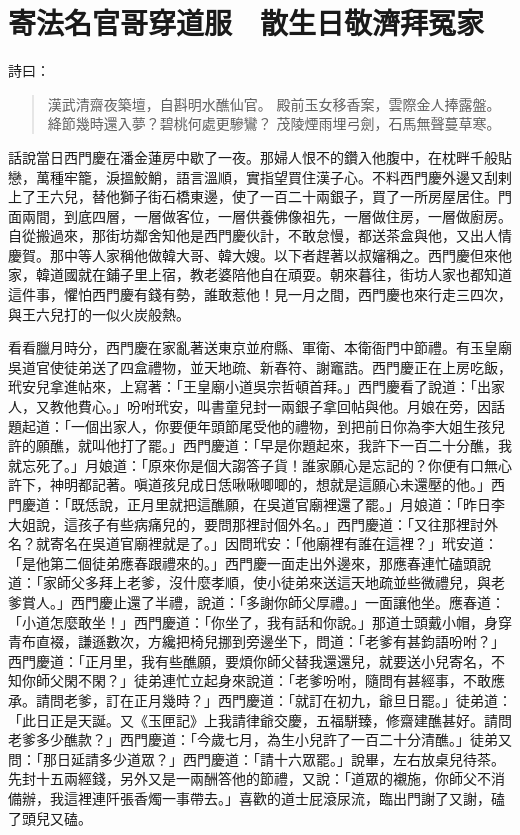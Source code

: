 
\chapter{寄法名官哥穿道服　散生日敬濟拜冤家}

詩曰：
\begin{quote}
漢武清齋夜築壇，自斟明水醮仙官。
殿前玉女移香案，雲際金人捧露盤。
絳節幾時還入夢？碧桃何處更驂鸞？
茂陵煙雨埋弓劍，石馬無聲蔓草寒。
\end{quote}

話說當日西門慶在潘金蓮房中歇了一夜。那婦人恨不的鑽入他腹中，在枕畔千般貼戀，萬種牢籠，淚搵鮫鮹，語言溫順，實指望買住漢子心。不料西門慶外邊又刮剌上了王六兒，替他獅子街石橋東邊，使了一百二十兩銀子，買了一所房屋居住。門面兩間，到底四層，一層做客位，一層供養佛像祖先，一層做住房，一層做廚房。自從搬過來，那街坊鄰舍知他是西門慶伙計，不敢怠慢，都送茶盒與他，又出人情慶賀。那中等人家稱他做韓大哥、韓大嫂。以下者趕著以叔嬸稱之。西門慶但來他家，韓道國就在鋪子里上宿，教老婆陪他自在頑耍。朝來暮往，街坊人家也都知道這件事，懼怕西門慶有錢有勢，誰敢惹他！見一月之間，西門慶也來行走三四次，與王六兒打的一似火炭般熱。

看看臘月時分，西門慶在家亂著送東京並府縣、軍衛、本衛衙門中節禮。有玉皇廟吳道官使徒弟送了四盒禮物，並天地疏、新春符、謝竈誥。西門慶正在上房吃飯，玳安兒拿進帖來，上寫著：「王皇廟小道吳宗哲頓首拜。」西門慶看了說道：「出家人，又教他費心。」吩咐玳安，叫書童兒封一兩銀子拿回帖與他。月娘在旁，因話題起道：「一個出家人，你要便年頭節尾受他的禮物，到把前日你為李大姐生孩兒許的願醮，就叫他打了罷。」西門慶道：「早是你題起來，我許下一百二十分醮，我就忘死了。」月娘道：「原來你是個大謅答子貨！誰家願心是忘記的？你便有口無心許下，神明都記著。嗔道孩兒成日恁啾啾唧唧的，想就是這願心未還壓的他。」西門慶道：「既恁說，正月里就把這醮願，在吳道官廟裡還了罷。」月娘道：「昨日李大姐說，這孩子有些病痛兒的，要問那裡討個外名。」西門慶道：「又往那裡討外名？就寄名在吳道官廟裡就是了。」因問玳安：「他廟裡有誰在這裡？」玳安道：「是他第二個徒弟應春跟禮來的。」西門慶一面走出外邊來，那應春連忙磕頭說道：「家師父多拜上老爹，沒什麼孝順，使小徒弟來送這天地疏並些微禮兒，與老爹賞人。」西門慶止還了半禮，說道：「多謝你師父厚禮。」一面讓他坐。應春道：「小道怎麼敢坐！」西門慶道：「你坐了，我有話和你說。」那道士頭戴小帽，身穿青布直裰，謙遜數次，方纔把椅兒挪到旁邊坐下，問道：「老爹有甚鈞語吩咐？」西門慶道：「正月里，我有些醮願，要煩你師父替我還還兒，就要送小兒寄名，不知你師父閑不閑？」徒弟連忙立起身來說道：「老爹吩咐，隨問有甚經事，不敢應承。請問老爹，訂在正月幾時？」西門慶道：「就訂在初九，爺旦日罷。」徒弟道：「此日正是天誕。又《玉匣記》上我請律爺交慶，五福駢臻，修齋建醮甚好。請問老爹多少醮款？」西門慶道：「今歲七月，為生小兒許了一百二十分清醮。」徒弟又問：「那日延請多少道眾？」西門慶道：「請十六眾罷。」說畢，左右放桌兒待茶。先封十五兩經錢，另外又是一兩酬答他的節禮，又說：「道眾的襯施，你師父不消備辦，我這裡連阡張香燭一事帶去。」喜歡的道士屁滾尿流，臨出門謝了又謝，磕了頭兒又磕。

